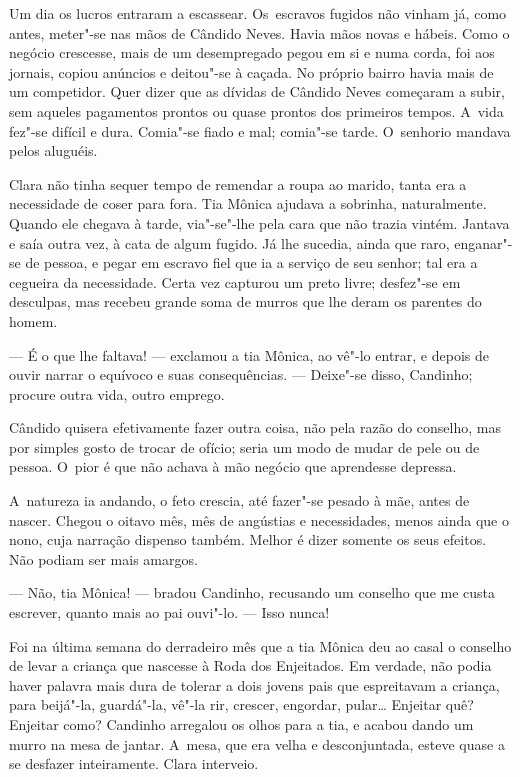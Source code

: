 \begin{linenumbers}
Um dia os lucros entraram a escassear. Os~escravos fugidos não vinham
já, como antes, meter"-se nas mãos de Cândido Neves. Havia mãos novas e
hábeis. Como o negócio crescesse, mais de um desempregado pegou em si e
numa corda, foi aos jornais, copiou anúncios e deitou"-se à caçada. No
próprio bairro havia mais de um competidor. Quer dizer que as dívidas de
Cândido Neves começaram a subir, sem aqueles pagamentos prontos ou quase
prontos dos primeiros tempos. A~vida fez"-se difícil e dura. Comia"-se
fiado e mal; comia"-se tarde. O~senhorio mandava pelos aluguéis.

Clara não tinha sequer tempo de remendar a roupa ao marido, tanta era a
necessidade de coser para fora. Tia Mônica ajudava a sobrinha,
naturalmente. Quando ele chegava à tarde, via"-se"-lhe pela cara que não
trazia vintém. Jantava e saía outra vez, à cata de algum fugido. Já lhe
sucedia, ainda que raro, enganar"-se de pessoa, e pegar em escravo fiel
que ia a serviço de seu senhor; tal era a cegueira da necessidade. Certa
vez capturou um preto livre; desfez"-se em desculpas, mas recebeu grande
soma de murros que lhe deram os parentes do homem.

--- É o que lhe faltava! --- exclamou a tia Mônica, ao vê"-lo entrar, e
depois de ouvir narrar o equívoco e suas consequências. --- Deixe"-se
disso, Candinho; procure outra vida, outro emprego.

Cândido quisera efetivamente fazer outra coisa, não pela razão do
conselho, mas por simples gosto de trocar de ofício; seria um modo de
mudar de pele ou de pessoa. O~pior é que não achava à mão negócio que
aprendesse depressa.

A~natureza ia andando, o feto crescia, até fazer"-se pesado à mãe, antes
de nascer. Chegou o oitavo mês, mês de angústias e necessidades, menos
ainda que o nono, cuja narração dispenso também. Melhor é dizer somente
os seus efeitos. Não podiam ser mais amargos.

--- Não, tia Mônica! --- bradou Candinho, recusando um conselho que me
custa escrever, quanto mais ao pai ouvi"-lo. --- Isso nunca!

Foi na última semana do derradeiro mês que a tia Mônica deu ao casal o
conselho de levar a criança que nascesse à Roda dos Enjeitados. Em
verdade, não podia haver palavra mais dura de tolerar a dois jovens pais
que espreitavam a criança, para beijá"-la, guardá"-la, vê"-la rir, crescer,
engordar, pular\ldots{} Enjeitar quê? Enjeitar como? Candinho arregalou os
olhos para a tia, e acabou dando um murro na mesa de jantar. A~mesa, que
era velha e desconjuntada, esteve quase a se desfazer inteiramente.
Clara interveio.


\end{linenumbers}
